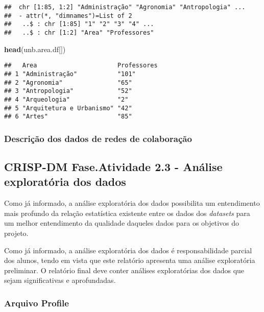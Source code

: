 \documentclass[]{article}
\newenvironment{Shaded}{\begin{snugshade}}{\end{snugshade}}
\newcommand{\KeywordTok}[1]{\textcolor[rgb]{0.13,0.29,0.53}{\textbf{#1}}}
\newcommand{\NormalTok}[1]{#1}
\begin{document}
\begin{verbatim}
##  chr [1:85, 1:2] "Administração" "Agronomia" "Antropologia" ...
##  - attr(*, "dimnames")=List of 2
##   ..$ : chr [1:85] "1" "2" "3" "4" ...
##   ..$ : chr [1:2] "Area" "Professores"
\end{verbatim}

\begin{Shaded}
\begin{Highlighting}[]
\KeywordTok{head}\NormalTok{(unb.area.df[])}
\end{Highlighting}
\end{Shaded}

\begin{verbatim}
##   Area                      Professores
## 1 "Administração"           "101"      
## 2 "Agronomia"               "65"       
## 3 "Antropologia"            "52"       
## 4 "Arqueologia"             "2"        
## 5 "Arquitetura e Urbanismo" "42"       
## 6 "Artes"                   "85"
\end{verbatim}

\subsubsection{Descrição dos dados de redes de
colaboração}\label{descricao-dos-dados-de-redes-de-colaboracao}

\subsection{CRISP-DM Fase.Atividade 2.3 - Análise exploratória dos
dados}\label{crisp-dm-fase.atividade-2.3---analise-exploratoria-dos-dados}

Como já informado, a análise exploratória dos dados possibilita um
entendimento mais profundo da relação estatística existente entre os
dados dos \emph{datasets} para um melhor entendimento da qualidade
daqueles dados para os objetivos do projeto.

Como já informado, a análise exploratória dos dados é responsabilidade
parcial dos alunos, tendo em vista que este relatório apresenta uma
análise exploratória preliminar. O relatório final deve conter análises
exploratórias dos dados que sejam significativas e aprofundadas.

\subsubsection{Arquivo Profile}\label{arquivo-profile}
\end{document}
